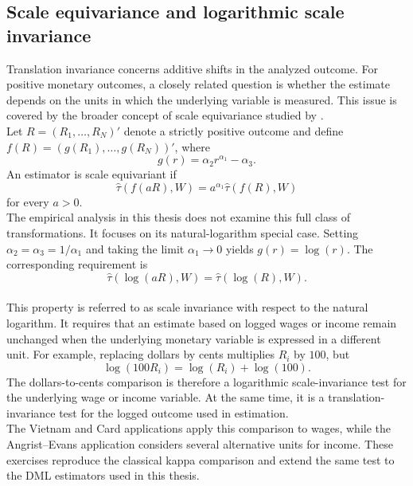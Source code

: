 \documentclass[12pt, a4paper, oneside]{article}
\theoremstyle{plain}
\theoremstyle{definition}
\begin{document}
\subsection{Scale equivariance and logarithmic scale invariance}
\label{subsec:scale_equivariance}
Translation invariance concerns additive shifts in the analyzed outcome. For positive
monetary outcomes, a closely related question is whether the estimate depends on the
units in which the underlying variable is measured. This issue is covered by the broader
concept of scale equivariance studied by \citet{sloczynski2025abadie}.\\
Let \(R=(R_1,\ldots,R_N)'\) denote a strictly positive outcome and define
\(f(R)=(g(R_1),\ldots,g(R_N))'\), where
\[
    g(r)=\alpha_2r^{\alpha_1}-\alpha_3.
\]
An estimator is scale equivariant if
\begin{equation}
    \widehat{\tau}\!\left(f(aR),W\right)
    =
    a^{\alpha_1}
    \widehat{\tau}\!\left(f(R),W\right)
    \label{eq:scale_equivariance_definition}
\end{equation}
for every \(a>0\).\\
The empirical analysis in this thesis does not examine this full class of
transformations. It focuses on its natural-logarithm special case. Setting
\(\alpha_2=\alpha_3=1/\alpha_1\) and taking the limit
\(\alpha_1\to0\) yields \(g(r)=\log(r)\). The corresponding requirement is
\begin{equation}
    \widehat{\tau}\!\left(\log(aR),W\right)
    =
    \widehat{\tau}\!\left(\log(R),W\right).
    \label{eq:log_scale_invariance}
\end{equation}\\
This property is referred to as scale invariance with respect to the natural logarithm.
It requires that an estimate based on logged wages or income remain unchanged when the
underlying monetary variable is expressed in a different unit. For example, replacing
dollars by cents multiplies \(R_i\) by \(100\), but
\[
    \log(100R_i)=\log(R_i)+\log(100).
\]
The dollars-to-cents comparison is therefore a logarithmic scale-invariance test for the
underlying wage or income variable. At the same time, it is a translation-invariance
test for the logged outcome used in estimation.\\
The Vietnam and Card applications apply this comparison to wages, while the
Angrist--Evans application considers several alternative units for income. These
exercises reproduce the classical kappa comparison and extend the same test to the DML
estimators used in this thesis.
\end{document}
